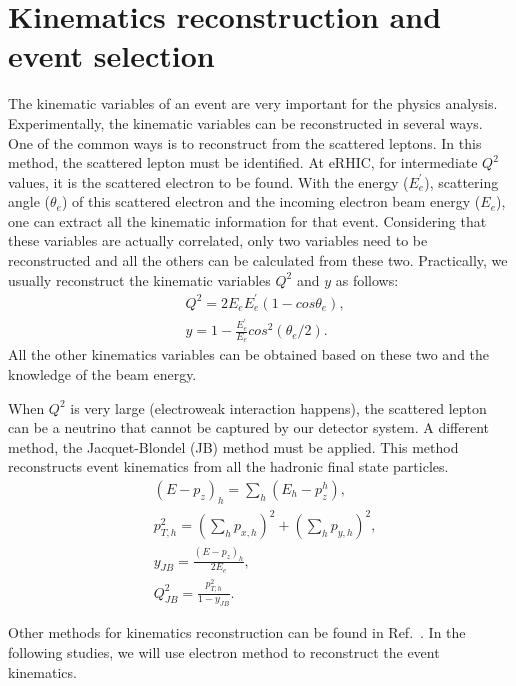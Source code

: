 \section{Kinematics reconstruction and event selection}
The kinematic variables of an event are very important for the physics analysis.
Experimentally, the kinematic variables can be reconstructed in several ways.
One of the common ways is to reconstruct from the scattered leptons. In this
method, the scattered lepton must be identified. At eRHIC, for intermediate
$Q^{2}$ values, it is the scattered electron to be found. With the energy
($E^{'}_{e}$), scattering angle ($\theta_{e}$) of this scattered electron and
the incoming electron beam energy ($E_{e}$), one can extract all the kinematic
information for that event. Considering that these variables are actually
correlated, only two variables need to be reconstructed and all the others can
be calculated from these two. Practically, we usually reconstruct the kinematic
variables $Q^{2}$ and $y$ as follows:
\begin{align}
& Q^{2}=2E_{e}E^{'}_{e}(1-cos\theta_{e}), \nonumber \\ 
& y=1-\frac{E^{'}_{e}}{E_{e}}cos^{2}(\theta_{e}/2).
\label{eqn:electr_method}
\end{align}
All the other kinematics variables can be obtained based on these two and
the knowledge of the beam energy. 

When $Q^{2}$ is very large  (electroweak interaction happens), the scattered
lepton can be a neutrino that cannot be captured by our detector system. A
different method, the Jacquet-Blondel (JB) method must be applied. This method
reconstructs event kinematics from all the hadronic final state particles.
\begin{align}
& (E-p_{z})_{h} = \sum_{h}(E_{h}-p_{z}^{h}), \nonumber \\ 
& p_{T,h}^{2} = (\sum_{h}p_{x,h})^{2}+(\sum_{h}p_{y,h})^{2}, \nonumber \\ 
& y_{JB}=\frac{(E-p_{z})_{h}}{2E_{e}}, \nonumber \\ 
& Q_{JB}^{2}=\frac{p_{T,h}^{2}}{1-y_{JB}}.
\end{align}

Other methods for kinematics reconstruction can be found in
Ref.~\cite{Blumlein:2012bf}. In the following studies, we will use electron
method to reconstruct the event kinematics. 


